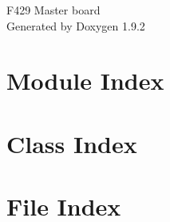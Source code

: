 \documentclass[twoside]{book}
\newcommand{\+}{\discretionary{\mbox{\scriptsize$\hookleftarrow$}}{}{}}
\newcommand{\clearemptydoublepage}{%
    \newpage{\pagestyle{empty}\cleardoublepage}%
  }
\begin{document}
  \raggedbottom
    \hypersetup{pageanchor=false,
                bookmarksnumbered=true,
                pdfencoding=unicode
               }
  \begin{titlepage}
  \vspace*{7cm}
  \begin{center}%
  {\Large F429 Master board}\\
  \vspace*{1cm}
  {\large Generated by Doxygen 1.9.2}\\
  \end{center}
  \end{titlepage}
  \clearemptydoublepage
  \tableofcontents
  \clearemptydoublepage
  \hypersetup{pageanchor=true}
\chapter{Module Index}

\chapter{Class Index}

\chapter{File Index}

\end{document}
